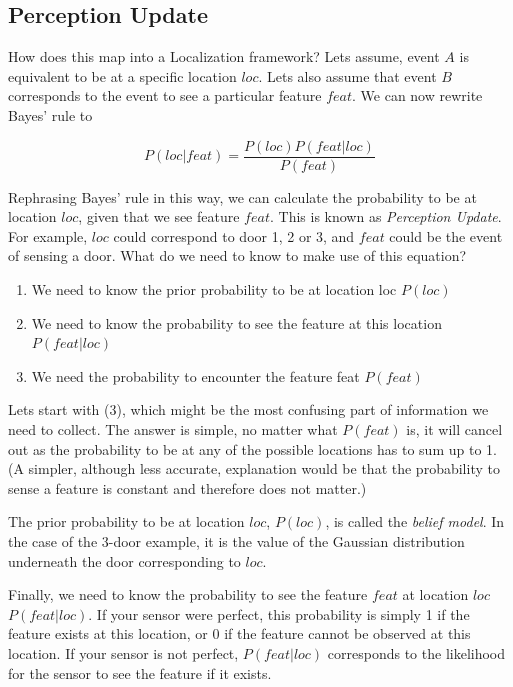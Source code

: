 \subsection{Perception Update}
How does this map into a Localization framework? Lets assume, event $A$ is equivalent to be at a specific location $loc$. Lets also assume that event $B$ corresponds to the event to see a particular feature $feat$. We can now rewrite Bayes' rule to

\begin{equation}
P(loc|feat)=\frac{P(loc)P(feat|loc)}{P(feat)}
\end{equation}

Rephrasing Bayes' rule in this way, we can calculate the probability to be at location $loc$, given that we see feature $feat$. This is known as \emph{Perception Update}. For example, $loc$ could correspond to door 1, 2 or 3, and $feat$ could be the event of sensing a door. What do we need to know to make use of this equation?
\begin{enumerate}
\item We need to know the prior probability to be at location loc $P(loc)$
\item We need to know the probability to see the feature at this location $P(feat|loc)$
\item We need the probability to encounter the feature feat $P(feat)$
\end{enumerate}
Lets start with (3), which might be the most confusing part of information we need to collect. The answer is simple, no matter what $P(feat)$ is, it will cancel out as the probability to be at any of the possible locations has to sum up to 1. (A simpler, although less accurate, explanation would be that the probability to sense a feature is constant and therefore does not matter.)

The prior probability to be at location  $loc$, $P(loc)$, is called the  \emph{belief model}. In the case of the 3-door example, it is the value of the Gaussian distribution underneath the door corresponding to $loc$. 

Finally, we need to know the probability to see the feature $feat$ at location $loc$ $P(feat|loc)$. If your sensor were perfect, this probability is simply 1 if the feature exists at this location, or 0 if the feature cannot be observed at this location. If your sensor is not perfect, $P(feat|loc)$ corresponds to the likelihood for the sensor to see the feature if it exists.

